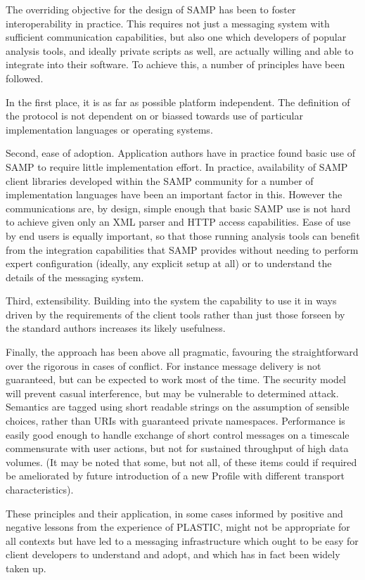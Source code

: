 \documentclass[5p]{elsarticle}
\begin{document}
The overriding objective for the design of SAMP
has been to foster interoperability in practice.
This requires not just a messaging system with sufficient communication
capabilities, but also one which developers of popular analysis tools,
and ideally private scripts as well,
are actually willing and able to integrate into their software.
To achieve this, a number of principles
have been followed.

In the first place, it is as far as possible platform independent.
The definition of the protocol is not dependent on or biassed
towards use of particular implementation languages or operating systems.

Second, ease of adoption.
Application authors have in practice found basic use of 
SAMP to require little implementation effort.
In practice, availability of SAMP client libraries
developed within the SAMP community
for a number of implementation languages have been an important
factor in this.
However the communications are, by design, simple enough that
basic SAMP use is not hard to achieve given only an XML parser
and HTTP access capabilities.
Ease of use by end users is equally important,
so that those running analysis tools
can benefit from the integration capabilities that SAMP provides
without needing to perform expert configuration
(ideally, any explicit setup at all) or to understand the details
of the messaging system.

Third, extensibility.
Building into the system the capability to use it in ways
driven by the requirements of the client tools rather than
just those forseen by the standard authors increases its likely usefulness.

Finally, the approach has been above all pragmatic, favouring
the straightforward over the rigorous in cases of conflict.
For instance message delivery is not guaranteed, but can be 
expected to work most of the time.
The security model will prevent casual interference,
but may be vulnerable to determined attack.
Semantics are tagged
using short readable strings on the assumption of sensible choices,
rather than URIs with guaranteed private namespaces.
Performance is easily good enough to handle exchange of short control
messages on a timescale commensurate with user actions,
but not for sustained throughput of high data volumes.
(It may be noted that some, but not all,
of these items could if required be ameliorated by future
introduction of a new Profile with different transport characteristics).

These principles and their application, in some cases informed
by positive and negative lessons from the experience of PLASTIC,
might not be appropriate for all contexts
but have led to a messaging infrastructure
which ought to be easy for client developers to understand and adopt,
and which has in fact been widely taken up.
\end{document}
